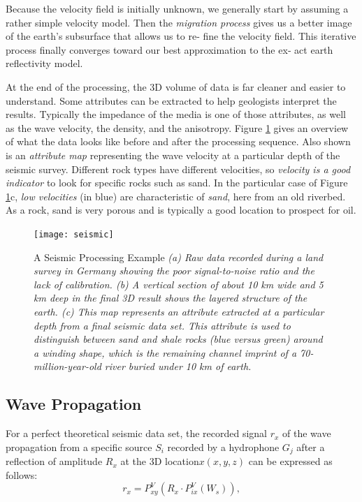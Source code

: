 \documentclass[twocolumn]{article}
\begin{document}
Because the velocity field is initially unknown, we generally start by assuming a rather simple velocity model. Then the \textit{migration process} gives us a better image of the earth's subsurface that allows us to re‐ fine the velocity field. This iterative process finally converges toward our best approximation to the ex‐ act earth reflectivity model.

At the end of the processing, the 3D volume of data is far cleaner and easier to understand. Some attributes can be extracted to help geologists interpret the results. Typically the impedance of the media is one of those attributes, as well as the wave velocity, the density, and the anisotropy. Figure \ref{seismic} gives an overview of what the data looks like before and after the processing sequence. Also shown is an \textit{attribute map} representing the wave velocity at a particular depth of the seismic survey. Different rock types have different velocities, so \textit{velocity is a good indicator} to look for specific rocks such as sand. In the particular case of Figure \ref{seismic}c, \textit{low velocities }(in blue) are characteristic of \textit{sand}, here from an old riverbed. As a rock, sand is very porous and is typically a good location to prospect for oil.

\begin{figure}[htb]
        \centering
        \texttt{[image: seismic]}
        \caption{A Seismic Processing Example \small{\emph{ (a) Raw data recorded during a land survey in Germany showing the poor signal-to-noise ratio and the lack of calibration. (b) A vertical section of about 10 km wide and 5 km deep in the final 3D result shows the layered structure of the earth. (c) This map represents an attribute extracted at a particular depth from a final seismic data set. This attribute is used to distinguish between sand and shale rocks (blue versus green) around a winding shape, which is the remaining channel imprint of a 70-million-year-old river buried under 10 km of earth.
	}}
	}
        \label{seismic}
\end{figure}

\subsection{Wave Propagation}
For a perfect theoretical seismic data set, the recorded signal $r_x$ of the wave propagation from a specific source $S_i$ recorded by a hydrophone $G_j$ after a reflection of amplitude $R_x$ at the 3D location$ x(x, y, z)$ can be expressed as follows:
\begin{equation}
r_x = P^V_{xy}(R_x \cdot P^V_{ix}(W_s)),
\label{equ01}
\end{equation}
\end{document}
